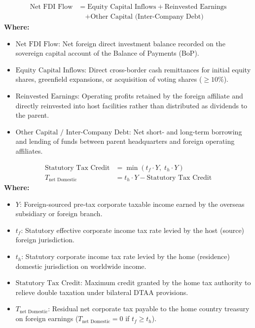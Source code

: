 \begin{formulabox}
\begin{align*}
    \text{Net FDI Flow} &= \text{Equity Capital Inflows} + \text{Reinvested Earnings} \\
    &\quad + \text{Other Capital (Inter-Company Debt)}
\end{align*}
\textbf{Where:}
\begin{itemize}[leftmargin=*, noitemsep]
    \item $\text{Net FDI Flow}$: Net foreign direct investment balance recorded on the sovereign capital account of the Balance of Payments (BoP).
    \item $\text{Equity Capital Inflows}$: Direct cross-border cash remittances for initial equity shares, greenfield expansions, or acquisition of voting shares ($\ge 10\%$).
    \item $\text{Reinvested Earnings}$: Operating profits retained by the foreign affiliate and directly reinvested into host facilities rather than distributed as dividends to the parent.
    \item $\text{Other Capital / Inter-Company Debt}$: Net short- and long-term borrowing and lending of funds between parent headquarters and foreign operating affiliates.
\end{itemize}
\end{formulabox}

\begin{formulabox}
\begin{align*}
    \text{Statutory Tax Credit} &= \min\left( t_f \cdot Y, \; t_h \cdot Y \right) \\[0.4em]
    T_{\text{net Domestic}} &= t_h \cdot Y - \text{Statutory Tax Credit}
\end{align*}
\textbf{Where:}
\begin{itemize}[leftmargin=*, noitemsep]
    \item $Y$: Foreign-sourced pre-tax corporate taxable income earned by the overseas subsidiary or foreign branch.
    \item $t_f$: Statutory effective corporate income tax rate levied by the host (source) foreign jurisdiction.
    \item $t_h$: Statutory corporate income tax rate levied by the home (residence) domestic jurisdiction on worldwide income.
    \item $\text{Statutory Tax Credit}$: Maximum credit granted by the home tax authority to relieve double taxation under bilateral DTAA provisions.
    \item $T_{\text{net Domestic}}$: Residual net corporate tax payable to the home country treasury on foreign earnings ($T_{\text{net Domestic}} = 0$ if $t_f \ge t_h$).
\end{itemize}
\end{formulabox}
